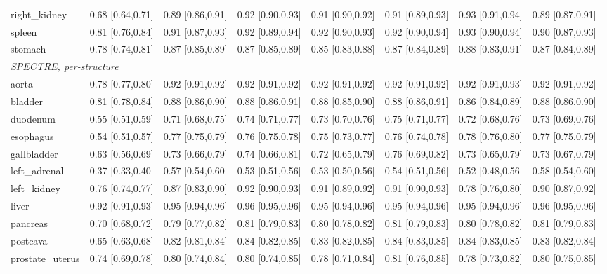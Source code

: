 \begin{tabular}{lccccccc}
right\_kidney & 0.68 [0.64,0.71] & 0.89 [0.86,0.91] & 0.92 [0.90,0.93] & 0.91 [0.90,0.92] & 0.91 [0.89,0.93] & 0.93 [0.91,0.94] & 0.89 [0.87,0.91] \\
spleen & 0.81 [0.76,0.84] & 0.91 [0.87,0.93] & 0.92 [0.89,0.94] & 0.92 [0.90,0.93] & 0.92 [0.90,0.94] & 0.93 [0.90,0.94] & 0.90 [0.87,0.93] \\
stomach & 0.78 [0.74,0.81] & 0.87 [0.85,0.89] & 0.87 [0.85,0.89] & 0.85 [0.83,0.88] & 0.87 [0.84,0.89] & 0.88 [0.83,0.91] & 0.87 [0.84,0.89] \\
\multicolumn{8}{l}{\textit{SPECTRE, per-structure}} \\
aorta & 0.78 [0.77,0.80] & 0.92 [0.91,0.92] & 0.92 [0.91,0.92] & 0.92 [0.91,0.92] & 0.92 [0.91,0.92] & 0.92 [0.91,0.93] & 0.92 [0.91,0.92] \\
bladder & 0.81 [0.78,0.84] & 0.88 [0.86,0.90] & 0.88 [0.86,0.91] & 0.88 [0.85,0.90] & 0.88 [0.86,0.91] & 0.86 [0.84,0.89] & 0.88 [0.86,0.90] \\
duodenum & 0.55 [0.51,0.59] & 0.71 [0.68,0.75] & 0.74 [0.71,0.77] & 0.73 [0.70,0.76] & 0.75 [0.71,0.77] & 0.72 [0.68,0.76] & 0.73 [0.69,0.76] \\
esophagus & 0.54 [0.51,0.57] & 0.77 [0.75,0.79] & 0.76 [0.75,0.78] & 0.75 [0.73,0.77] & 0.76 [0.74,0.78] & 0.78 [0.76,0.80] & 0.77 [0.75,0.79] \\
gallbladder & 0.63 [0.56,0.69] & 0.73 [0.66,0.79] & 0.74 [0.66,0.81] & 0.72 [0.65,0.79] & 0.76 [0.69,0.82] & 0.73 [0.65,0.79] & 0.73 [0.67,0.79] \\
left\_adrenal & 0.37 [0.33,0.40] & 0.57 [0.54,0.60] & 0.53 [0.51,0.56] & 0.53 [0.50,0.56] & 0.54 [0.51,0.56] & 0.52 [0.48,0.56] & 0.58 [0.54,0.60] \\
left\_kidney & 0.76 [0.74,0.77] & 0.87 [0.83,0.90] & 0.92 [0.90,0.93] & 0.91 [0.89,0.92] & 0.91 [0.90,0.93] & 0.78 [0.76,0.80] & 0.90 [0.87,0.92] \\
liver & 0.92 [0.91,0.93] & 0.95 [0.94,0.96] & 0.96 [0.95,0.96] & 0.95 [0.94,0.96] & 0.95 [0.94,0.96] & 0.95 [0.94,0.96] & 0.96 [0.95,0.96] \\
pancreas & 0.70 [0.68,0.72] & 0.79 [0.77,0.82] & 0.81 [0.79,0.83] & 0.80 [0.78,0.82] & 0.81 [0.79,0.83] & 0.80 [0.78,0.82] & 0.81 [0.79,0.83] \\
postcava & 0.65 [0.63,0.68] & 0.82 [0.81,0.84] & 0.84 [0.82,0.85] & 0.83 [0.82,0.85] & 0.84 [0.83,0.85] & 0.84 [0.83,0.85] & 0.83 [0.82,0.84] \\
prostate\_uterus & 0.74 [0.69,0.78] & 0.80 [0.74,0.84] & 0.80 [0.74,0.85] & 0.78 [0.71,0.84] & 0.81 [0.76,0.85] & 0.78 [0.73,0.82] & 0.80 [0.75,0.85] \\

\end{tabular}
